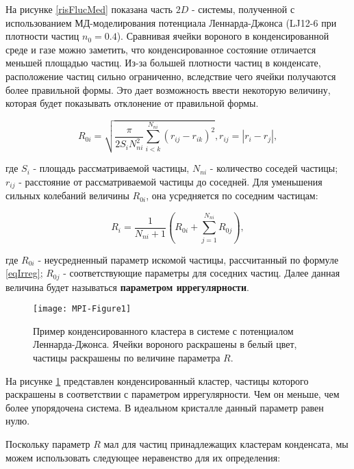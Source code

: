 На рисунке \ref{risFlucMed} показана часть $2D$ - системы, полученной с использованием МД-моделирования потенциала Леннарда-Джонса (LJ12-6 при плотности частиц $n_0 = 0.4$).
Сравнивая ячейки вороного в конденсированной среде и газе можно заметить, что конденсированное состояние отличается меньшей площадью частиц. Из-за большей плотности частиц в конденсате, расположение частиц сильно ограниченно, вследствие чего ячейки получаются более правильной формы. Это дает возможность ввести некоторую величину, которая будет показывать отклонение от правильной формы.

\begin{equation}
	R_{0i} = \sqrt{\frac{\pi}{2 S_i N_{ni}^2} \sum\limits_{i<k}^{N_{ni}} (r_{ij} - r_{ik})^2}, r_{ij} = |r_i - r_j|,
\end{equation}

где $S_i$ - площадь рассматриваемой частицы, $N_{ni}$ - количество соседей частицы; $r_{ij}$ - расстояние от рассматриваемой частицы до соседней.
Для уменьшения сильных колебаний величины $R_{0i}$, она усредняется по соседним частицам:

\begin{equation}\label{eqIrreg}
R_i = \frac{1}{N_{ni} + 1} \left( R_{0i} + \sum\limits_{j=1}^{N_{ni}} R_{0j} \right),
\end{equation}

где $R_{0i}$ - неусредненный параметр искомой частицы, рассчитанный по формуле \ref{eqIrreg}; $R_{0j}$ - соответствующие параметры для соседних частиц.  
Далее данная величина будет называться \textbf{параметром иррегулярности}.

\begin{figure}[htbp!]
\begin{center}
\texttt{[image: MPI-Figure1]}
\caption{Пример конденсированного кластера в системе с потенциалом Леннарда-Джонса. Ячейки вороного раскрашены в белый цвет, частицы раскрашены по величине параметра $R$.}
\label{risIrreg}
\end{center}
\end{figure}

На рисунке \ref{risIrreg} представлен конденсированный кластер, частицы которого раскрашены в соответствии с параметром иррегулярности. Чем он меньше, чем более упорядочена система. В идеальном кристалле данный параметр равен нулю.

Поскольку параметр $R$ мал для частиц принадлежащих кластерам конденсата, мы можем использовать следующее неравенство для их определения:

